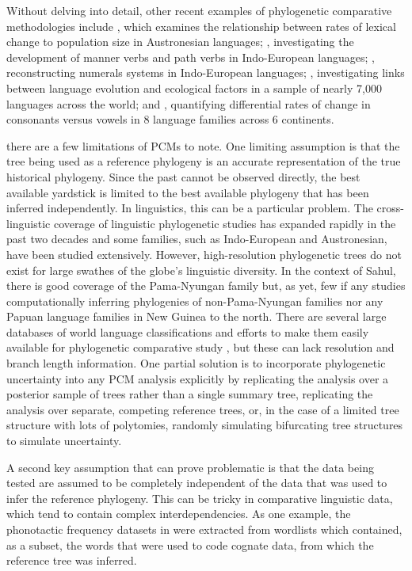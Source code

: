 Without delving into detail, other recent examples of phylogenetic comparative methodologies include \textcite{bromham_rate_2015}, which examines the relationship between rates of lexical change to population size in Austronesian languages; \textcite{verkerk_where_2015}, investigating the development of manner verbs and path verbs in Indo-European languages; \textcite{calude_typology_2016}, reconstructing numerals systems in Indo-European languages; \textcite{bentz_evolution_2018}, investigating links between language evolution and ecological factors in a sample of nearly 7,000 languages across the world; and \textcite{moran_investigating_2020}, quantifying differential rates of change in consonants versus vowels in 8 language families across 6 continents.

there are a few limitations of PCMs to note. One limiting assumption is that the tree being used as a reference phylogeny is an accurate representation of the true historical phylogeny. Since the past cannot be observed directly, the best available yardstick is limited to the best available phylogeny that has been inferred independently. In linguistics, this can be a particular problem. The cross-linguistic coverage of linguistic phylogenetic studies has expanded rapidly in the past two decades and some families, such as Indo-European and Austronesian, have been studied extensively. However, high-resolution phylogenetic trees do not exist for large swathes of the globe's linguistic diversity. In the context of Sahul, there is good coverage of the Pama-Nyungan family \autocites{bowern_computational_2012}{bouckaert_origin_2018} but, as yet, few if any studies computationally inferring phylogenies of non-Pama-Nyungan families nor any Papuan language families in New Guinea to the north. There are several large databases of world language classifications and efforts to make them easily available for phylogenetic comparative study \autocite{dediu_making_2018}, but these can lack resolution and branch length information. One partial solution is to incorporate phylogenetic uncertainty into any PCM analysis explicitly by replicating the analysis over a posterior sample of trees rather than a single summary tree, replicating the analysis over separate, competing reference trees, or, in the case of a limited tree structure with lots of polytomies, randomly simulating bifurcating tree structures to simulate uncertainty.

A second key assumption that can prove problematic is that the data being tested are assumed to be completely independent of the data that was used to infer the reference phylogeny. This can be tricky in comparative linguistic data, which tend to contain complex interdependencies. As one example, the phonotactic frequency datasets in \textcite{macklin-cordes_phylogenetic_2021} were extracted from wordlists which contained, as a subset, the words that were used to code cognate data, from which the reference tree was inferred.

